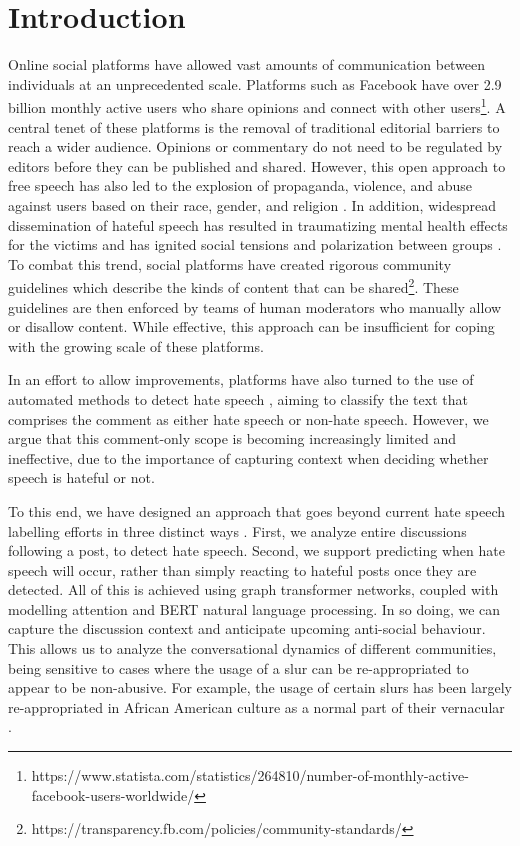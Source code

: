 \documentclass[letterpaper]{article} %
\begin{document}
\section{Introduction}
Online social platforms have allowed vast amounts of communication between individuals at an unprecedented scale. Platforms such as Facebook have over 2.9 billion monthly active users who share opinions and connect with other users\footnote{https://www.statista.com/statistics/264810/number-of-monthly-active-facebook-users-worldwide/}. A central tenet of these platforms is the removal of traditional editorial barriers to reach a wider audience. Opinions or commentary do not need to be regulated by editors before they can be published and shared. However, this open approach to free speech has also led to the explosion of propaganda, violence, and abuse against users based on their race, gender, and religion \cite{das2020hate}. In addition, widespread dissemination of hateful speech has resulted in traumatizing mental health effects for the victims \cite{janikke2019hate} and has ignited social tensions and polarization between groups \cite{Waller2021}. To combat this trend, social platforms have created rigorous community guidelines which describe the kinds of content that can be shared\footnote{https://transparency.fb.com/policies/community-standards/}. These guidelines are then enforced by teams of human moderators who manually allow or disallow content. While effective, this approach can be insufficient for coping with the growing scale of these platforms. %

In an effort to allow improvements, platforms have also turned to the use of automated methods to detect hate speech \cite{das2022data, mathew2021hatexplain}, aiming to classify the text that comprises the comment as either hate speech or non-hate speech. However, we argue that this comment-only scope is becoming increasingly limited and ineffective, due to the importance of capturing context when deciding whether speech is hateful or not.

To this end, we have designed an approach that goes beyond current hate speech labelling efforts in three distinct ways \cite{hebert2022predicting}. First, we analyze entire discussions following a post, to detect hate speech. Second, we support predicting when hate speech will occur, rather than simply reacting to hateful posts once they are detected.
All of this is achieved using graph transformer networks, coupled with modelling attention and BERT natural language processing. In so doing, we can capture the discussion context and anticipate upcoming anti-social behaviour.
This allows us to analyze the conversational dynamics of different communities, being sensitive to cases where the usage of a slur can be re-appropriated to appear to be non-abusive. For example, the usage of certain slurs has been largely re-appropriated in African American culture as a normal part of their vernacular \cite{thomas2007phonological}.
\end{document}
